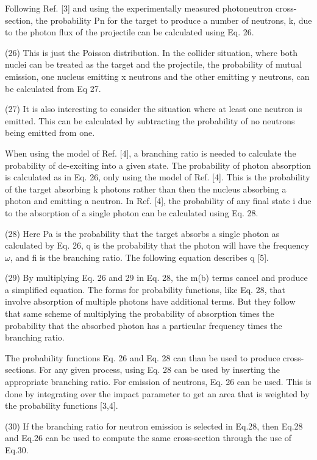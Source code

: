     Following Ref.
    [3] and using the experimentally measured photoneutron cross-section, the probability Pn for the target to produce a number of neutrons, k, due to the photon flux of the projectile can be calculated using Eq.
    26.

    (26)
    This is just the Poisson distribution.
    In the collider situation, where both nuclei can be treated as the target and the projectile, the probability of mutual emission, one nucleus emitting x neutrons and the other emitting y neutrons, can be calculated from Eq 27.

    (27)
    It is also interesting to consider the situation where at least one neutron is emitted.
    This can be calculated by subtracting the probability of no neutrons being emitted from one.

    When using the model of Ref.
    [4], a branching ratio is needed to calculate the probability of de-exciting into a given state.
    The probability of photon absorption is calculated as in Eq.
    26, only using the model of Ref.
    [4].
    This is the probability of the target absorbing k photons rather than then the nucleus absorbing a photon and emitting a neutron.
    In Ref.
    [4], the probability of any final state i due to the absorption of a single photon can be calculated using Eq.
    28.

    (28)
    Here Pa is the probability that the target absorbs a single photon as calculated by Eq.
    26, q is the probability that the photon will have the frequency $\omega$, and fi is the branching ratio.
    The following equation describes q [5].

    (29)
    By multiplying Eq.
    26 and 29 in Eq.
    28, the m(b) terms cancel and produce a simplified equation.
    The forms for probability functions, like Eq.
    28, that involve absorption of multiple photons have additional terms.
    But they follow that same scheme of multiplying the probability of absorption times the probability that the absorbed photon has a particular frequency times the branching ratio.

    The probability functions Eq.
    26 and Eq.
    28 can than be used to produce cross-sections.
    For any given process, using Eq.
    28 can be used by inserting the appropriate branching ratio.
    For emission of neutrons, Eq.
    26 can be used.
    This is done by integrating over the impact parameter to get an area that is weighted by the probability functions [3,4].

    (30)
    If the branching ratio for neutron emission is selected in Eq.28, then Eq.28 
      and Eq.26 can be used to compute the same cross-section through the use 
      of Eq.30.
    
